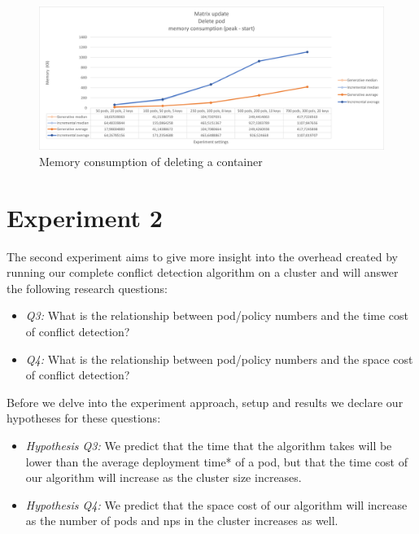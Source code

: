 \begin{figure}[H]
    \centering
    \includegraphics[width=\textwidth]{images/experiment1/delPod-memory.png}
    \caption{Memory consumption of deleting a container}
    \label{fig:exp1-delPod-memory}
\end{figure}



\section{Experiment 2}\label{sec:experiment2}
The second experiment aims to give more insight into the overhead created by running our complete conflict detection algorithm on a cluster and will answer the following research questions:

\begin{itemize}
    \item \textit{Q3:} What is the relationship between pod/policy numbers and the time cost of conflict detection?
    \item \textit{Q4:} What is the relationship between pod/policy numbers and the space cost of conflict detection?
\end{itemize}

Before we delve into the experiment approach, setup and results we declare our hypotheses for these questions:

\begin{itemize}
    \item \textit{Hypothesis Q3:} We predict that the time that the algorithm takes will be lower than the average deployment time* of a pod, but that the time cost of our algorithm will increase as the cluster size increases.
    \item \textit{Hypothesis Q4:} We predict that the space cost of our algorithm will increase as the number of pods and \acrshort{np}s in the cluster increases as well.
\end{itemize}

